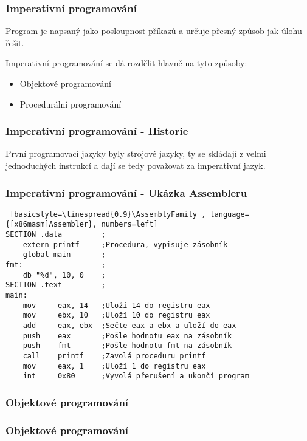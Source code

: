 \begin{frame}
    \frametitle{Imperativní programování}
    Program je napsaný jako posloupnost příkazů a určuje přesný způsob jak úlohu řešit. %

    Imperativní programování se dá rozdělit hlavně na tyto způsoby: 
    \begin{itemize}
        \item Objektové programování
        \item Procedurální programování
    \end{itemize}

    
\end{frame}

\begin{frame}[fragile]
    \frametitle{Imperativní programování - Historie}
    První programovací jazyky byly strojové jazyky, ty se skládají z velmi jednoduchých instrukcí a dají se tedy považovat za imperativní jazyk.

\end{frame}

\begin{frame}[fragile]

    \frametitle{Imperativní programování - Ukázka Assembleru}

    \newfontfamily{}
    \begin{lstlisting} [basicstyle=\linespread{0.9}\AssemblyFamily , language={[x86masm]Assembler}, numbers=left]
SECTION .data         ;
    extern printf     ;Procedura, vypisuje zásobník
    global main       ;
fmt:                  ;
    db "%d", 10, 0    ;
SECTION .text         ;
main:
    mov     eax, 14   ;Uloží 14 do registru eax
    mov     ebx, 10   ;Uloží 10 do registru eax
    add     eax, ebx  ;Sečte eax a ebx a uloží do eax
    push    eax       ;Pošle hodnotu eax na zásobník
    push    fmt       ;Pošle hodnotu fmt na zásobník
    call    printf    ;Zavolá proceduru printf
    mov     eax, 1    ;Uloží 1 do registru eax
    int     0x80      ;Vyvolá přerušení a ukončí program
    \end{lstlisting}
\end{frame}

\begin{frame}
    \frametitle{Objektové programování}
    

\end{frame}

\begin{frame}
    \frametitle{Objektové programování}
    
\end{frame}